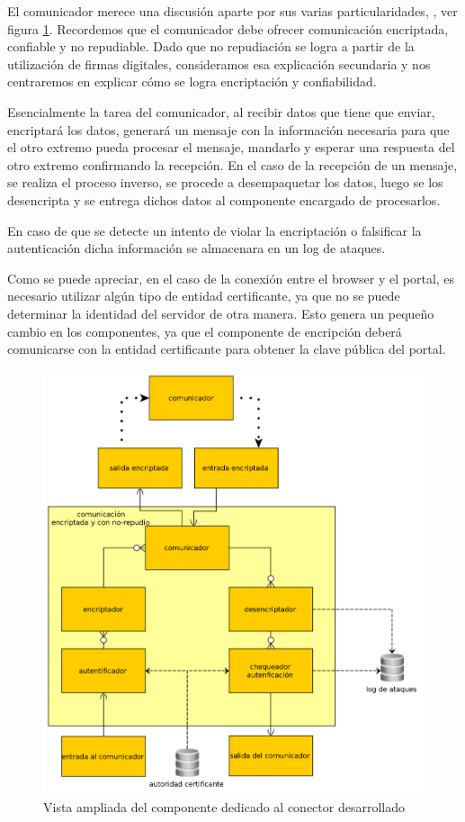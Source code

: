 El comunicador merece una discusión aparte por sus varias particularidades, , ver figura \ref{fig:comunicador}. Recordemos que el comunicador debe ofrecer comunicación encriptada, confiable y no repudiable. Dado que no repudiación se logra a partir de la utilización de firmas digitales, consideramos esa explicación secundaria y nos centraremos en explicar cómo se logra encriptación y confiabilidad.

Esencialmente la tarea del comunicador, al recibir datos que tiene que enviar, encriptará los datos, generará un mensaje con la información necesaria para que el otro extremo pueda procesar el mensaje, mandarlo y esperar una respuesta del otro extremo confirmando la recepción.
En el caso de la recepción de un mensaje, se realiza el proceso inverso, se procede a desempaquetar los datos, luego se los desencripta y se entrega dichos datos al componente encargado de procesarlos.

En caso de que se detecte un intento de violar la encriptación o falsificar la autenticación dicha información se almacenara en un log de ataques.

Como se puede apreciar, en el caso de la conexión entre el browser y el portal, es necesario utilizar algún tipo de entidad certificante, ya que no se puede determinar la identidad del servidor de otra manera. Esto genera un pequeño cambio en los componentes, ya que el componente de encripción deberá comunicarse con la entidad certificante para obtener la clave pública del portal.

\begin{figure}[H]
	\begin{center}
		\includegraphics[scale=0.26]{../diagramas/conector.png}
	\end{center} 
	\caption{Vista ampliada del componente dedicado al conector desarrollado}	
	\label{fig:comunicador}
\end{figure} 

